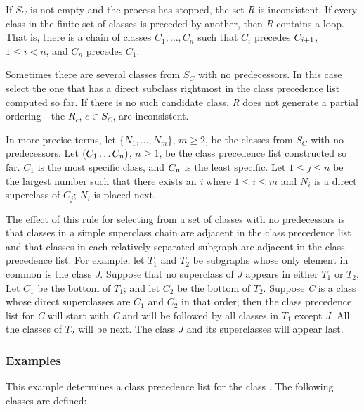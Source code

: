 If $S_{C}$ is not empty and the process has stopped, the set \emph{R} is
inconsistent. If every class in the finite set of classes is preceded
by another, then \emph{R} contains a loop. That is, there is a chain of
classes $C_1,\ldots,C_{n}$
such that $C_{i}$ precedes
$C_{i+1}$, $1\leq i<n$,
and $C_{n}$ precedes $C_1$.

Sometimes there are several classes from $S_{C}$ with no
predecessors.  In this case select the one that has a direct
subclass rightmost in the class precedence list computed so far.
If there is no
such candidate class, \emph{R} does not generate a partial ordering---the
$R_{c}$, $c\in S_{C}$, are inconsistent.

In more precise terms, let $\{N_1,\ldots,N_{m}\}$,
$m\geq 2$, be
the classes from $S_{C}$ with no predecessors.  Let $(C_
1\ldots C_{n})$, $n\geq 1$, be the class precedence list
constructed so far.  $C_1$ is the most specific class, and $C_
n$ is the least specific.  Let $1\leq j\leq n$ be the largest number
such that there exists an \emph{i} where $1\leq i\leq m$ and
$N_{i}$
is a direct superclass of $C_{j}$;
$N_{i}$ is placed next.

The effect of this rule for selecting from a set of classes with no
predecessors is that classes in a simple superclass chain are
adjacent in the class precedence list and that classes in each
relatively separated subgraph are adjacent in the class
precedence list. For example, let $T_1$ and $T_2$ be subgraphs
whose only element in common is the class \emph{J}. Suppose
that no superclass of \emph{J} appears in either $T_1$ or $T_2$.
Let $C_1$ be the bottom of $T_1$; and let $C_2$ be the
bottom of $T_2$.  Suppose \emph{C} is a class whose direct superclasses
are $C_1$ and $C_2$ in that order; then the class precedence
list for \emph{C} will start with \emph{C} and will be followed by all classes
in $T_1$ except \emph{J}. All the classes of $T_2$ will be next.
The class \emph{J} and its superclasses will appear last.


\subsubsection{Examples}

This example determines a class precedence list for the
class .  The following classes are defined:

